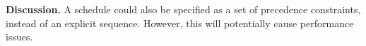 {\bf Discussion.}
A schedule could also be specified as a set of precedence constraints, instead of an explicit sequence. However, this will potentially cause performance issues.